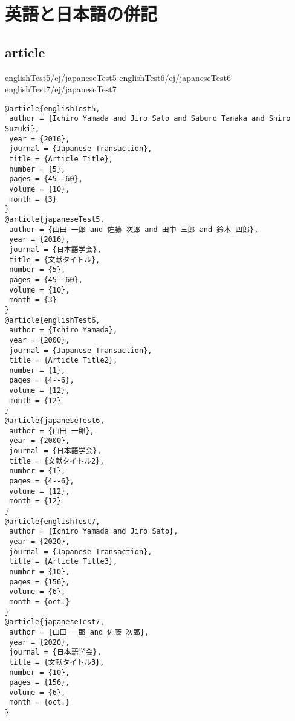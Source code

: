 \documentclass[10pt,a4paper]{article}
\begin{document}
\section{英語と日本語の併記}
\subsection{article}

englishTest5/ej/japaneseTest5 \cite{englishTest5/ej/japaneseTest5}
englishTest6/ej/japaneseTest6 \cite{englishTest6/ej/japaneseTest6}
englishTest7/ej/japaneseTest7 \cite{englishTest7/ej/japaneseTest7}
\begin{lstlisting}
@article{englishTest5,
 author = {Ichiro Yamada and Jiro Sato and Saburo Tanaka and Shiro Suzuki},
 year = {2016},
 journal = {Japanese Transaction},
 title = {Article Title},
 number = {5},
 pages = {45--60},
 volume = {10},
 month = {3}
}
@article{japaneseTest5,
 author = {山田 一郎 and 佐藤 次郎 and 田中 三郎 and 鈴木 四郎},
 year = {2016},
 journal = {日本語学会},
 title = {文献タイトル},
 number = {5},
 pages = {45--60},
 volume = {10},
 month = {3}
}
@article{englishTest6,
 author = {Ichiro Yamada},
 year = {2000},
 journal = {Japanese Transaction},
 title = {Article Title2},
 number = {1},
 pages = {4--6},
 volume = {12},
 month = {12}
}
@article{japaneseTest6,
 author = {山田 一郎},
 year = {2000},
 journal = {日本語学会},
 title = {文献タイトル2},
 number = {1},
 pages = {4--6},
 volume = {12},
 month = {12}
}
@article{englishTest7,
 author = {Ichiro Yamada and Jiro Sato},
 year = {2020},
 journal = {Japanese Transaction},
 title = {Article Title3},
 number = {10},
 pages = {156},
 volume = {6},
 month = {oct.}
}
@article{japaneseTest7,
 author = {山田 一郎 and 佐藤 次郎},
 year = {2020},
 journal = {日本語学会},
 title = {文献タイトル3},
 number = {10},
 pages = {156},
 volume = {6},
 month = {oct.}
}
\end{lstlisting}

% 

% 


\end{document}
